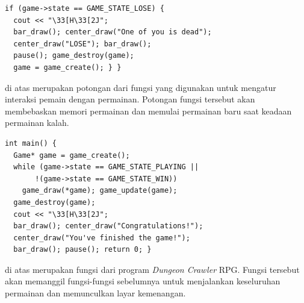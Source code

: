 \documentclass[../main.tex]{subfiles}
\begin{document}
\begin{code}
\begin{verbatim}
if (game->state == GAME_STATE_LOSE) {
  cout << "\33[H\33[2J";
  bar_draw(); center_draw("One of you is dead");
  center_draw("LOSE"); bar_draw();
  pause(); game_destroy(game);
  game = game_create(); } }
\end{verbatim}
\end{code}

{\Script} di atas merupakan potongan dari fungsi  yang digunakan untuk mengatur interaksi pemain dengan permainan. Potongan fungsi tersebut akan membebaskan memori permainan dan memulai permainan baru saat keadaan permainan kalah.

\begin{code}
\begin{verbatim}
int main() {
  Game* game = game_create();
  while (game->state == GAME_STATE_PLAYING ||
       !(game->state == GAME_STATE_WIN))
    game_draw(*game); game_update(game);
  game_destroy(game);
  cout << "\33[H\33[2J";
  bar_draw(); center_draw("Congratulations!");
  center_draw("You've finished the game!");
  bar_draw(); pause(); return 0; }
\end{verbatim}
\end{code}

{\Script} di atas merupakan fungsi  dari program \textit{Dungeon Crawler} RPG. Fungsi tersebut akan memanggil fungsi-fungsi sebelumnya untuk menjalankan keseluruhan permainan dan memunculkan layar kemenangan.
\end{document}
